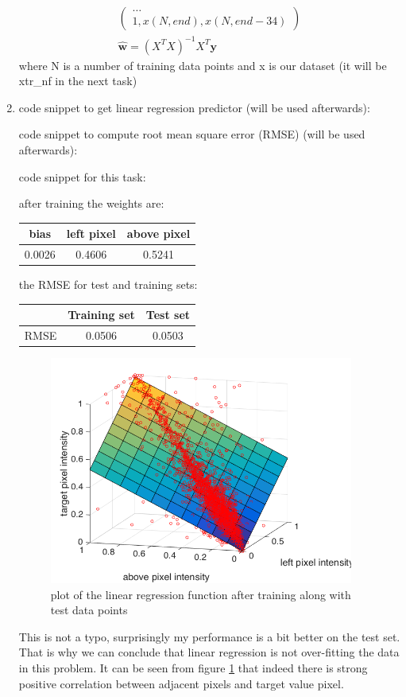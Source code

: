 \documentclass{article}
\newcommand{\vect}[1]{\boldsymbol{#1}} %
\begin{document}
\begin{enumerate}[label=(\alph*)]
\begin{gather*}
\begin{pmatrix}
						\ldots \\
						1, x(N, end), x(N, end -34)
						\end{pmatrix} \\
						\hat{\vect{w}} = (X^T X)^{-1} X^T \vect{y}
					\end{gather*}
					where N is a number of training data points and x is our dataset (it will be xtr\_nf in the next task)
				\item
					code snippet to get linear regression predictor (will be used afterwards):
					 
					code snippet to compute root mean square error (RMSE) (will be used afterwards):
					
					code snippet for this task:
					
					after training the weights are:
					\begin{center}
						\begin{tabular}{| c | c | c |}
							\hline
							bias & left pixel & above pixel \\ \hline
							0.0026  & 0.4606 & 0.5241 \\ 
							\hline
						\end{tabular}
					\end{center}					
					the RMSE for test and training sets:
					\begin{center}
						\begin{tabular}{| c | c | c |}
							\hline
							\, & Training set & Test set \\ \hline
							RMSE  & 0.0506 & 0.0503 \\ 
							\hline
						\end{tabular}
					\end{center}
				 	\begin{figure}[t]
				 		\centering
				 		\includegraphics[width=10cm]{images/p1-2-c}
				 		\caption{plot of the linear regression function after training along with test data points}
				 		\label{fig:p1-2-c}
				 	\end{figure}
					This is not a typo, surprisingly my performance is a bit better on the test set. That is why we can conclude that linear regression is not over-fitting the data in this problem. It can be seen from figure \ref{fig:p1-2-c} that indeed there is strong positive correlation between adjacent pixels and target value pixel. 
			\end{enumerate}
			\newpage
\end{document}
